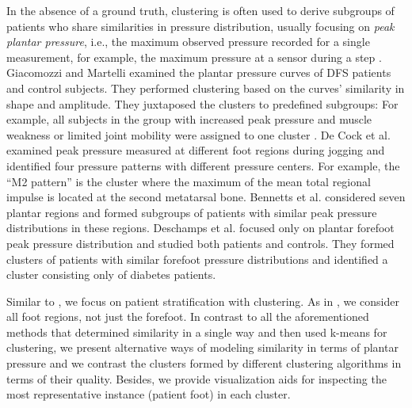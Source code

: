 \documentclass[
  oneside]{book}
\begin{document}
In the absence of a ground truth, clustering is often used to derive subgroups of patients who share similarities in pressure distribution, usually focusing on \emph{peak plantar pressure}, i.e., the maximum observed pressure recorded for a single measurement, for example, the maximum pressure at a sensor during a step \autocite{GiacomozziMartelli:PeakPressure2006,DeCockEtAl:FootTypeClusteringPlantarPressure2006,BennettsEtAl:Biomechanics2013,DeschampsEtAL:KMeansDiabeticFoot2013}.
Giacomozzi and Martelli \autocite{GiacomozziMartelli:PeakPressure2006} examined the plantar pressure curves of DFS patients and control subjects.
They performed clustering based on the curves' similarity in shape and amplitude.
They juxtaposed the clusters to predefined subgroups: For example, all subjects in the group with increased peak pressure and muscle weakness or limited joint mobility were assigned to one cluster \autocite{GiacomozziMartelli:PeakPressure2006}.
De Cock et al. \autocite{DeCockEtAl:FootTypeClusteringPlantarPressure2006} examined peak pressure measured at different foot regions during jogging and identified four pressure patterns with different pressure centers.
For example, the ``M2 pattern'' is the cluster where the maximum of the mean total regional impulse is located at the second metatarsal bone.
Bennetts et al. \autocite{BennettsEtAl:Biomechanics2013} considered seven plantar regions and formed subgroups of patients with similar peak pressure distributions in these regions.
Deschamps et al. \autocite{DeschampsEtAL:KMeansDiabeticFoot2013} focused only on plantar forefoot peak pressure distribution and studied both patients and controls.
They formed clusters of patients with similar forefoot pressure distributions and identified a cluster consisting only of diabetes patients.

Similar to \autocite{BennettsEtAl:Biomechanics2013,DeCockEtAl:FootTypeClusteringPlantarPressure2006}, we focus on patient stratification with clustering.
As in \autocite{BennettsEtAl:Biomechanics2013,GiacomozziMartelli:PeakPressure2006}, we consider all foot regions, not just the forefoot.
In contrast to all the aforementioned methods that determined similarity in a single way and then used k-means for clustering, we present alternative ways of modeling similarity in terms of plantar pressure and we contrast the clusters formed by different clustering algorithms in terms of their quality.
Besides, we provide visualization aids for inspecting the most representative instance (patient foot) in each cluster.
\end{document}
